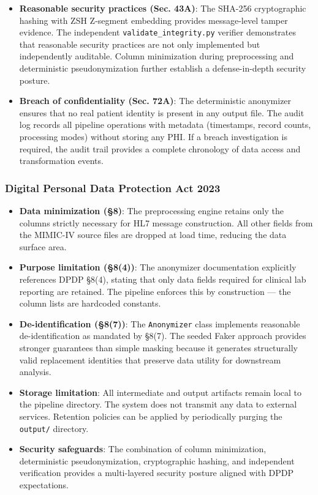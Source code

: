\documentclass[12pt,a4paper]{report}
\begin{document}
\begin{itemize}
    \item \textbf{Reasonable security practices (Sec. 43A)}: The SHA-256 cryptographic
    hashing with ZSH Z-segment embedding provides message-level tamper evidence.
    The independent \texttt{validate\_integrity.py} verifier demonstrates that
    reasonable security practices are not only implemented but independently
    auditable. Column minimization during preprocessing and deterministic
    pseudonymization further establish a defense-in-depth security posture.

    \item \textbf{Breach of confidentiality (Sec. 72A)}: The deterministic anonymizer
    ensures that no real patient identity is present in any output file. The audit
    log records all pipeline operations with metadata (timestamps, record counts,
    processing modes) without storing any PHI. If a breach investigation is required,
    the audit trail provides a complete chronology of data access and transformation
    events.
\end{itemize}

\subsubsection{Digital Personal Data Protection Act 2023}

\begin{itemize}
    \item \textbf{Data minimization (§8)}: The preprocessing engine retains only the
    columns strictly necessary for HL7 message construction. All other fields from
    the MIMIC-IV source files are dropped at load time, reducing the data surface
    area.

    \item \textbf{Purpose limitation (§8(4))}: The anonymizer documentation explicitly
    references DPDP §8(4), stating that only data fields required for clinical lab
    reporting are retained. The pipeline enforces this by construction --- the column
    lists are hardcoded constants.

    \item \textbf{De-identification (§8(7))}: The \texttt{Anonymizer} class implements
    reasonable de-identification as mandated by §8(7). The seeded Faker approach
    provides stronger guarantees than simple masking because it generates
    structurally valid replacement identities that preserve data utility for
    downstream analysis.

    \item \textbf{Storage limitation}: All intermediate and output artifacts remain
    local to the pipeline directory. The system does not transmit any data to
    external services. Retention policies can be applied by periodically purging
    the \texttt{output/} directory.

    \item \textbf{Security safeguards}: The combination of column minimization,
    deterministic pseudonymization, cryptographic hashing, and independent
    verification provides a multi-layered security posture aligned with DPDP
    expectations.
\end{itemize}
\end{document}
